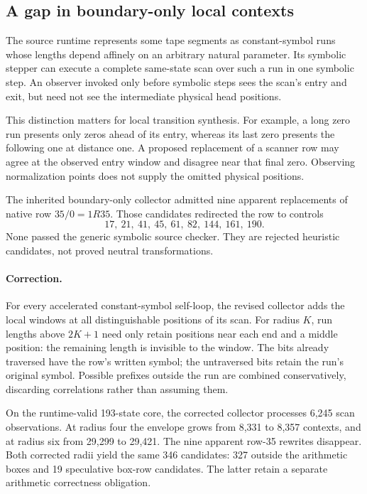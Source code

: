 \subsection{A gap in boundary-only local contexts}

The source runtime represents some tape segments as constant-symbol runs
whose lengths depend affinely on an arbitrary natural parameter.  Its symbolic
stepper can execute a complete same-state scan over such a run in one symbolic
step.  An observer invoked only before symbolic steps sees the scan's entry
and exit, but need not see the intermediate physical head positions.

This distinction matters for local transition synthesis.  For example, a long
zero run presents only zeros ahead of its entry, whereas its last zero presents
the following one at distance one.  A proposed replacement of a scanner row
may agree at the observed entry window and disagree near that final zero.
Observing normalization points does not supply the omitted physical positions.

The inherited boundary-only collector admitted nine apparent replacements of
native row $35/0=1R35$.  Those candidates redirected the row to controls
\[
  17,\ 21,\ 41,\ 45,\ 61,\ 82,\ 144,\ 161,\ 190.
\]
None passed the generic symbolic source checker.  They are rejected heuristic
candidates, not proved neutral transformations.

\paragraph{Correction.}
For every accelerated constant-symbol self-loop, the revised collector adds
the local windows at all distinguishable positions of its scan.  For radius
$K$, run lengths above $2K+1$ need only retain positions near each end and a
middle position: the remaining length is invisible to the window.  The bits
already traversed have the row's written symbol; the untraversed bits retain
the run's original symbol.  Possible prefixes outside the run are combined
conservatively, discarding correlations rather than assuming them.

On the runtime-valid 193-state core, the corrected collector processes
6,245 scan observations.  At radius four the envelope grows from 8,331 to
8,357 contexts, and at radius six from 29,299 to 29,421.  The nine apparent
row-35 rewrites disappear.  Both corrected radii yield the same 346 candidates:
327 outside the arithmetic boxes and 19 speculative box-row candidates.
The latter retain a separate arithmetic correctness obligation.

